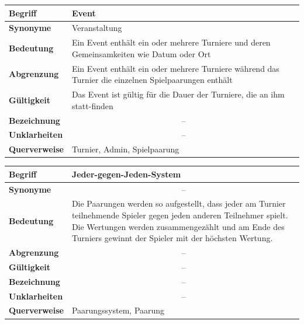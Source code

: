 \documentclass[11pt]{article}
\begin{document}
\begin{tabularx}{\textwidth}{| p{} | p{} |}
	\hline
	\textbf{Begriff} & Event\\
	\hline
	\textbf{Synonyme} & Veranstaltung \\
	\hline
	\textbf{Bedeutung} & Ein Event enthält ein oder mehrere Turniere und deren Gemeinsamkeiten wie Datum oder Ort\\
	\hline
	\textbf{Abgrenzung} & Ein Event enthält ein oder mehrere Turniere während das Turnier die einzelnen Spielpaarungen enthält\\
	\hline
	\textbf{Gültigkeit} & Das Event ist gültig für die Dauer der Turniere, die an ihm statt-finden\\
	\hline
	\textbf{Bezeichnung} & \multicolumn{1}{c|}{--} \\
	\hline
	\textbf{Unklarheiten} & \multicolumn{1}{c|}{--} \\
	\hline
	\textbf{Querverweise} & Turnier, Admin, Spielpaarung\\
	\hline
\end{tabularx}

\newpage

\begin{tabularx}{\textwidth}{| p{} | p{} |}
	\hline
	\textbf{Begriff} & Jeder-gegen-Jeden-System\\ 
	\hline
	\textbf{Synonyme} & \multicolumn{1}{c|}{--}\\
	\hline 
	\textbf{Bedeutung} & Die Paarungen werden so aufgestellt, dass jeder am Turnier teilnehmende Spieler gegen jeden anderen Teilnehmer spielt. Die Wertungen werden zusammengezählt und am Ende des Turniers gewinnt der Spieler mit der höchsten Wertung.\\
	\hline
	\textbf{Abgrenzung} & \multicolumn{1}{c|}{--}\\
	\hline
	\textbf{Gültigkeit} & \multicolumn{1}{c|}{--}\\
	\hline
	\textbf{Bezeichnung} & \multicolumn{1}{c|}{--}\\
	\hline
	\textbf{Unklarheiten} & \multicolumn{1}{c|}{--} \\
	\hline
	\textbf{Querverweise} & Paarungssystem, Paarung\\
	\hline
\end{tabularx}
\end{document}
